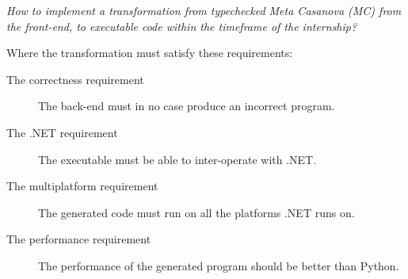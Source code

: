 \textit{How to implement a transformation from typechecked Meta Casanova (MC) from the front-end, to executable code within the timeframe of the internship?}

Where the transformation must satisfy these requirements:
\begin{description}
    \item[The correctness requirement] The back-end must in no case produce an incorrect program.
    \item[The .NET requirement] The executable must be able to inter-operate with .NET.
    \item[The multiplatform requirement] The generated code must run on all the platforms .NET runs on.
    \item[The performance requirement] The performance of the generated program should be better than Python.
\end{description}
